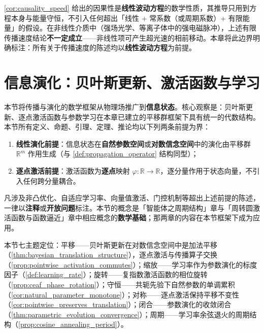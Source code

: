\begin{remark}[因果性的严格边界]\label{rem:propagation_causality_boundary}
\cref{cor:causality_speed} 给出的因果性是\textbf{线性波动方程}的数学性质，其推导只用到方程本身与能量守恒，不引入任何超出「线性 + 常系数（或周期系数）+ 有限能量」的假设。在非线性介质中（强场光学、等离子体中的强电磁脉冲），上述有限传播速度结论\textbf{不一定成立}——非线性项可产生超光速的相前移动。本章将此边界明确标注：所有关于传播速度的陈述均以\textbf{线性波动方程}为前提。
\end{remark}

\section{信息演化：贝叶斯更新、激活函数与学习}\label{sec:information_evolution}

\begin{remark}[本节定位与严格前提]\label{rem:information_evolution_positioning}
本节将传播与演化的数学框架从物理场推广到\textbf{信息状态}。核心观察是：贝叶斯更新、逐点激活函数与参数学习在本章已建立的平移群框架下具有统一的代数结构。本节所有定义、命题、引理、定理、推论均以下列两条前提为界：

\begin{enumerate}[label=(\alph*)]
    \item \textbf{线性演化前提}：信息状态在\textbf{自然参数空间}或\textbf{对数信念空间}中的演化由平移群 $\mathbb{R}^m$ 作用生成（与 \cref{def:propagation_operator} 结构同型）；
    \item \textbf{逐点激活前提}：激活函数为\textbf{逐点}映射 $\varphi:\mathbb{R}\to\mathbb{R}$，逐分量作用于状态向量，不引入任何跨分量耦合。
\end{enumerate}

凡涉及非凸优化、自适应学习率、向量值激活、门控机制等超出上述前提的陈述，一律以\textbf{注释}或\textbf{开放问题}标注。本节的概念是「智能体之周期结构」章与「周转圆激活函数与函数逼近」章中相应概念的\textbf{数学基础}；那两章的内容在本节框架下成为应用。

本节七主题定位：平移——贝叶斯更新在对数信念空间中是加法平移（\cref{thm:bayesian_translation_structure}），逐点激活与传播算子交换（\cref{prop:pointwise_activation_commutes}）；缩放——学习率作为参数演化的标度因子（\cref{def:learning_rate}）；旋转——复指数激活函数的相位旋转（\cref{prop:ceaf_phase_rotation}）；守恒——共轭先验下自然参数的单调累积（\cref{cor:natural_parameter_monotone}）；对称——逐点激活保持平移不变性（\cref{cor:pointwise_preserves_translation}）；闭合——参数演化的收敛闭合（\cref{thm:parametric_evolution_convergence}）；周期——学习率余弦退火的周期结构（\cref{prop:cosine_annealing_period}）。
\end{remark}

